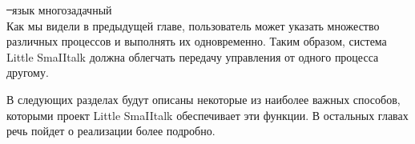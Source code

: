 \begin{description}
    \item{\st\ язык многозадачный}\ \\
    Как мы видели в предыдущей главе, пользователь может указать множество
    различных процессов и выполнять их одновременно. Таким образом, система
    Little SmaIItalk должна облегчать передачу управления от одного процесса
    другому.

\end{description}

В следующих разделах будут описаны некоторые из наиболее важных способов,
которыми проект Little SmaIItalk обеспечивает эти функции. В остальных главах
речь пойдет о реализации более подробно.











\secup
